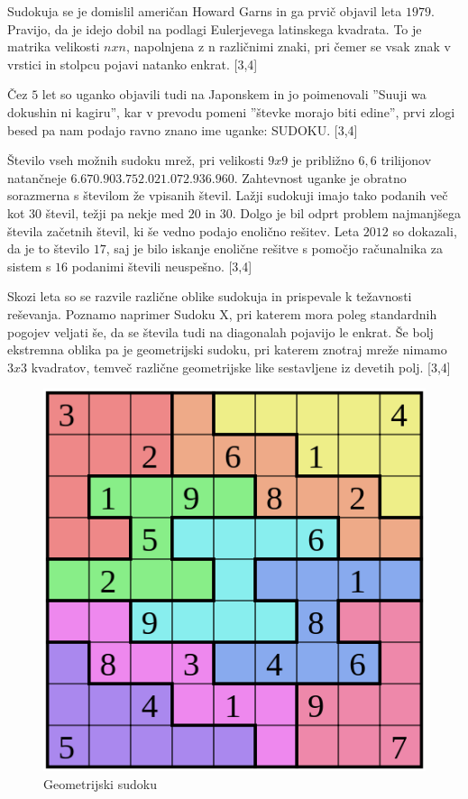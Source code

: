 \documentclass[A4paper, 11pt]{article}
\begin{document}
\pagebreak

Sudokuja se je domislil američan Howard Garns in ga prvič objavil leta $1979$. Pravijo, da je idejo dobil na podlagi Eulerjevega latinskega kvadrata. To je matrika velikosti $nxn$, napolnjena z n različnimi znaki, pri čemer se vsak znak v vrstici in stolpcu pojavi natanko enkrat. [3,4]

Čez $5$ let so uganko objavili tudi na Japonskem in jo poimenovali ''Suuji wa dokushin ni kagiru'', kar v prevodu pomeni ''števke morajo biti edine'', prvi zlogi besed pa nam podajo ravno znano ime uganke: SUDOKU. [3,4]

Število vseh možnih sudoku mrež, pri velikosti $9x9$ je približno $6,6$ trilijonov natančneje $6.670.903.752.021.072.936.960$. Zahtevnost uganke je obratno sorazmerna s številom že vpisanih števil. Lažji sudokuji imajo tako podanih več kot $30$ števil, težji pa nekje med $20$ in $30$. Dolgo je bil odprt problem najmanjšega števila začetnih števil, ki še vedno podajo enolično rešitev. Leta $2012$ so dokazali, da je to število $17$, saj je bilo iskanje enolične rešitve s pomočjo računalnika za sistem s $16$ podanimi števili neuspešno. [3,4]

Skozi leta so se razvile različne oblike sudokuja in prispevale k težavnosti reševanja. Poznamo naprimer Sudoku X, pri katerem mora poleg standardnih pogojev veljati še, da se števila tudi na diagonalah pojavijo le enkrat. Še bolj ekstremna oblika pa je geometrijski sudoku, pri katerem znotraj mreže nimamo $3x3$ kvadratov, temveč različne geometrijske like sestavljene iz devetih polj. [3,4]

\begin{figure}[h]
\centering
\caption{Geometrijski sudoku}
\includegraphics[scale=0.4]{geo_sudoku}
\end{figure}
\end{document}
